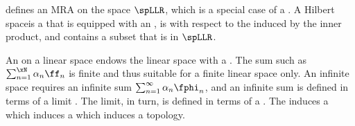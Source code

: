  defines an MRA on the space $\spLLR$, which is a special case of a .
A Hilbert spaceis a that is 
equipped with an ,
is with respect to the 
induced by the inner product,
and contains a subset that is in $\spLLR$.

An  on a linear space endows the linear space with a .
The sum such as $\sum_{n=1}^\xN \alpha_n \ff_n$ is finite and thus suitable for a finite linear space only.
An infinite space requires an infinite sum $\sum_{n=1}^\infty \alpha_n \fphi_n$, and an infinite sum is defined
in terms of a limit .
The limit, in turn, is defined in terms of a .
The  induces a   which induces a 
 which induces a topology.


%



